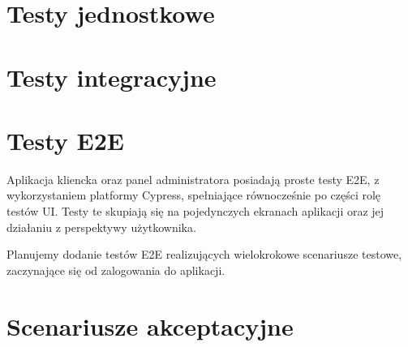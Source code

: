 \documentclass[12pt]{article}
\begin{document}

\tableofcontents

\newpage

\section{Testy jednostkowe}

\section{Testy integracyjne}

\section{Testy E2E}
Aplikacja kliencka oraz panel administratora posiadają proste testy E2E, z wykorzystaniem platformy Cypress, spełniające równocześnie po części rolę testów UI. Testy te skupiają się na pojedynczych ekranach aplikacji oraz jej działaniu z perspektywy użytkownika.

Planujemy dodanie testów E2E realizujących wielokrokowe scenariusze testowe, zaczynające się od zalogowania do aplikacji.

\section{Scenariusze akceptacyjne}
\end{document}
